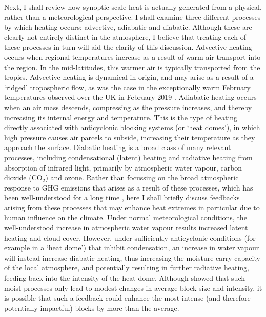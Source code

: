   Next, I shall review how synoptic-scale heat is actually generated from a physical, rather than a meteorological perspective. I shall examine three different processes by which heating occurs: advective, adiabatic and diabatic. Although these are clearly not entirely distinct in the atmosphere, I believe that treating each of these processes in turn will aid the clarity of this discussion. Advective heating occurs when regional temperatures increase as a result of warm air transport into the region. In the mid-latitudes, this warmer air is typically transported from the tropics. Advective heating is dynamical in origin, and may arise as a result of a `ridged' tropospheric flow, as was the case in the exceptionally warm February temperatures observed over the UK in February 2019 \citep{young_record-breaking_2020,leach_forecast-based_2021}. Adiabatic heating occurs when an air mass descends, compressing as the pressure increases, and thereby increasing its internal energy and temperature. This is the type of heating directly associated with anticyclonic blocking systems (or `heat domes'), in which high pressure causes air parcels to subside, increasing their temperature as they approach the surface. Diabatic heating is a broad class of many relevant processes, including condensational (latent) heating and radiative heating from absorption of infrared light, primarily by atmospheric water vapour, carbon dioxide (CO$_2$) and ozone. Rather than focussing on the broad atmospheric response to GHG emissions that arises as a result of these processes, which has been well-understood for a long time \citep{arrhenius_influence_1896}, here I shall briefly discuss feedbacks arising from these processes that may enhance heat extremes in particular due to human influence on the climate. Under normal meteorological conditions, the well-understood increase in atmospheric water vapour \citep{allen_constraints_2002} results increased latent heating and cloud cover. However, under sufficiently anticyclonic conditions (for example in a `heat dome') that inhibit condensation, an increase in water vapour will instead increase diabatic heating, thus increasing the moisture carry capacity of the local atmosphere, and potentially resulting in further radiative heating, feeding back into the intensity of the heat dome. Although \citet{steinfeld_response_2022} showed that such moist processes only lead to modest changes in average block size and intensity, it is possible that such a feedback could enhance the most intense (and therefore potentially impactful) blocks by more than the average.

